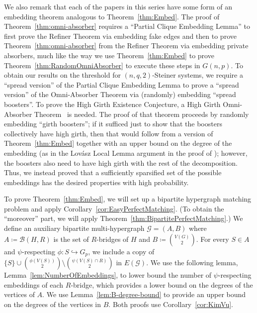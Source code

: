 \documentclass[11pt]{article}
\numberwithin{equation}{section}
\newcounter{i}
\theoremstyle{plain}
\theoremstyle{plain} %
\theoremstyle{definition}
\newcommand{\cB}{\mathcal{B}}
\newcommand{\cG}{\mathcal{G}}
\begin{document}
We also remark that each of the papers in this series have some form of an embedding theorem analogous to Theorem~\ref{thm:Embed}. The proof of Theorem~\ref{thm:omni-absorber} requires a ``Partial Clique Embedding Lemma'' \cite[Lemma 5.2]{DPI} to first prove the Refiner Theorem via embedding fake edges and then to prove Theorem~\ref{thm:omni-absorber} from the Refiner Theorem via embedding private absorbers, much like the way we use Theorem~\ref{thm:Embed} to prove Theorem~\ref{thm:RandomOmniAbsorber} to execute these steps in $G(n,p)$.  To obtain our results on the threshold for $(n,q,2)$-Steiner systems, we require a ``spread version'' of the Partial Clique Embedding Lemma \cite[Lemma 4.5]{DKPIV} to prove a ``spread version'' of the Omni-Absorber Theorem via (randomly) embedding ``spread boosters''.  To prove the High Girth Existence Conjecture, a High Girth Omni-Absorber Theorem~\cite[Theorem 2.22]{DPII} is needed. The proof of that theorem proceeds by randomly embedding ``girth boosters''; if it sufficed just to show that the boosters collectively have high girth, then that would follow from a version of Theorem~\ref{thm:Embed} together with an upper bound on the degree of the embedding (as in the Lov\'asz Local Lemma argument in the proof of \cite[Lemma 4.5]{DKPIV}); however, the boosters also need to have high girth with the rest of the decomposition. Thus, we instead proved \cite[Theorem 4.9]{DPII} that a sufficiently sparsified set of the possible embeddings has the desired properties with high probability. 

To prove Theorem~\ref{thm:Embed}, we will set up a bipartite hypergraph matching problem and apply Corollary~\ref{cor:EasyPerfectMatching}.
(To obtain the ``moreover'' part, we will apply Theorem~\ref{thm:BipartitePerfectMatching}.)
We define an auxiliary bipartite multi-hypergraph $\cG=(A,B)$ where $A \coloneqq \cB(H,R)$ is the set of $R$-bridges of $H$ and $B \coloneqq \binom{V(G)}{2}$.  
For every $S \in A$ and $\psi$-respecting $\phi : S \hookrightarrow G_p$, we include a copy of $\{S\} \cup \binom{\phi(V(S))}{2}\setminus \binom{\psi(V(S)\cap R)}{2}$ in $E(\cG)$.  
We use the following lemma, Lemma~\ref{lem:NumberOfEmbeddings}, to lower bound the number of $\psi$-respecting embeddings of each $R$-bridge, which provides a lower bound on the degrees of the vertices of $A$.  We use Lemma~\ref{lem:B-degree-bound} to provide an upper bound on the degrees of the vertices in $B$.  
Both proofs use Corollary~\ref{cor:KimVu}.
\end{document}
